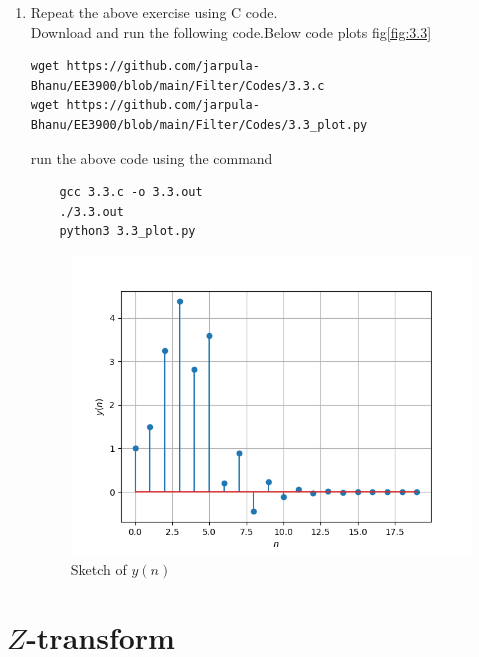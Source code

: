 \documentclass[journal,12pt,twocolumn]{IEEEtran}
\renewcommand\thesection{\arabic{section}}
\begin{document}
\begin{enumerate}[label=\thesection.\arabic*
,ref=\thesection.\theenumi]
\item Repeat the above exercise using C code.\\
\solution Download and run the following code.Below code plots fig\eqref{fig:3.3}
\begin{lstlisting}
wget https://github.com/jarpula-Bhanu/EE3900/blob/main/Filter/Codes/3.3.c
wget https://github.com/jarpula-Bhanu/EE3900/blob/main/Filter/Codes/3.3_plot.py
\end{lstlisting}
run the above code using the command
\begin{lstlisting}
	gcc 3.3.c -o 3.3.out
	./3.3.out
	python3 3.3_plot.py
\end{lstlisting}
\begin{figure}[h]
    \centering
    \includegraphics[width=\columnwidth]{./figs/3.3_plot.png}
    \caption{Sketch of $y(n)$}
    \label{fig:3.3}
\end{figure}


\end{enumerate}

\section{$Z$-transform}
\end{document}
